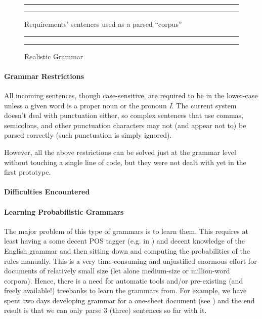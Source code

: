 \begin{figure}
\hrule\vskip4pt

\caption{Requirements' sentences used as a parsed ``corpus''}
\label{fig:asmt-sentences}
\vskip4pt\hrule
\end{figure}

\begin{figure}
\vskip4pt\hrule\vskip4pt
\tiny

\normalsize
\caption{Realistic Grammar}
\label{fig:asmt-grammar}
\vskip4pt\hrule
\end{figure}

\paragraph{Grammar Restrictions}

All incoming sentences, though case-sensitive, are required to be
in the lower-case unless a given word is a proper noun or the
pronoun {\it I}. The current system doesn't deal with punctuation
either, so complex sentences that use commas, semicolons, and
other punctuation characters may not (and appear not to) be
parsed correctly (such punctuation is simply ignored).

However, all the above restrictions can be solved just at the
grammar level without touching a single line of code,
but they were not dealt with yet in the first prototype.

\paragraph{Difficulties Encountered}
\label{sect:prob-app-troubles}

\paragraph*{Learning Probabilistic Grammars}

The major problem of this type of grammars is to learn them.
This requires at least having a some decent POS tagger
(e.g. in \cite{brill}) and decent knowledge of the English grammar
and then sitting down and computing the probabilities
of the rules manually. This is a very time-consuming
and unjustified enormous effort for documents of relatively
small size (let alone medium-size or million-word corpora).
Hence, there is a need for automatic tools and/or pre-existing
(and freely available!) treebanks to learn the grammars from.
For example, we have spent two days developing grammar for a one-sheet
document (see ) and the end result is that
we can only parse 3 (three) sentences so far with it.

